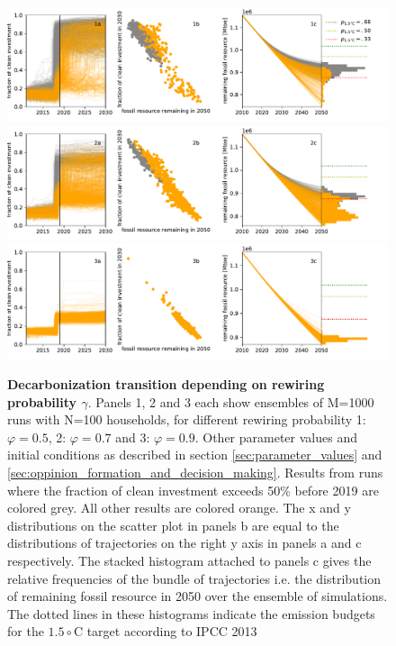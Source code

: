\begin{figure}[H]
	\centering
        \includegraphics[width = 1.2 \textwidth]{figures/fitted_initials_evaluation05.pdf}
        \includegraphics[width = 1.2 \textwidth]{figures/fitted_initials_evaluation07.pdf}
        \includegraphics[width = 1.2 \textwidth]{figures/fitted_initials_evaluation09.pdf}
        \caption[Trajectory of decarbonization transition depending on the network rewiring rate in the social learning process]{\textbf{Decarbonization transition depending on rewiring probability $\gamma$}. Panels 1, 2 and 3 each show ensembles of M=1000 runs with N=100 households, for different rewiring probability 1: $\varphi=0.5$, 2: $\varphi=0.7$ and 3: $\varphi=0.9$. Other parameter values and initial conditions as described in section \ref{sec:parameter_values} and \ref{sec:oppinion_formation_and_decision_making}. Results from runs where the fraction of clean investment exceeds 50\% before 2019 are colored grey. All other results are colored orange. The x and y distributions on the scatter plot in panels b are equal to the distributions of trajectories on the right y axis in panels a and c respectively. The stacked histogram attached to panels c gives the relative frequencies of the bundle of trajectories i.e. the distribution of remaining fossil resource in 2050 over the ensemble of simulations. The dotted lines in these histograms indicate the emission budgets for the $1.5\circ$C target according to IPCC 2013}
        \label{fig:default_alpha_05}
\end{figure}



